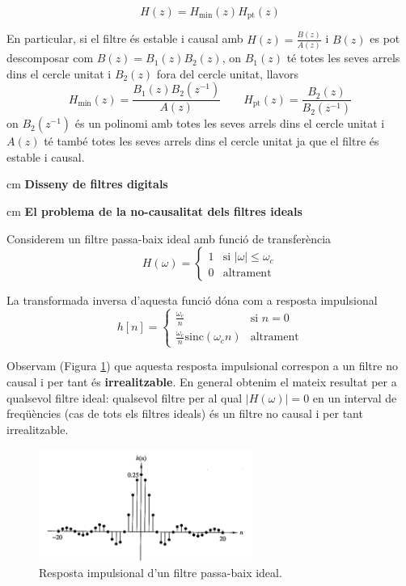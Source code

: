 \documentclass{article}
\begin{document}
\[
H(z)=H_{\text{min}}(z) H_{\text{pt}}(z)
\]

En particular, si el filtre és estable i causal amb $H(z)=\frac{B(z)}{A(z)}$ i 
$B(z)$ es pot descomposar com $B(z)=B_1(z) B_2(z)$,
on $B_1(z)$ té totes les seves arrels dins el cercle unitat i $B_2(z)$ fora del cercle unitat,
llavors 
\[
H_{\text{min}}(z)=\frac{ B_1(z) B_2(z^{-1}) }{A(z)}
\qquad 
H_{\text{pt}}(z)=\frac{B_2(z)}{B_2(z^{-1})}
\]
\noindent
on $B_2(z^{-1})$ és un polinomi amb totes les seves arrels dins el cercle unitat i $A(z)$ té també 
totes les seves arrels dins el cercle unitat ja que el filtre és estable i causal. 

 

 cm
\noindent
\textbf{\large Disseny de filtres digitals}

%
%
%
%

 cm
\noindent
\textbf{El problema de la no-causalitat dels filtres ideals}

Considerem un filtre passa-baix ideal amb funció de transferència
\[
H(\omega)=\begin{cases} 1 & \text{si } |\omega| \leq \omega_c \\ 0 & \text{altrament} \end{cases}
\]

La transformada inversa d'aquesta funció dóna com a resposta impulsional
\[
h[n]=\begin{cases} \frac{\omega_c}{n} & \text{si } n=0 \\ 
\frac{\omega_c}{n} \mathrm{sinc}(\omega_c n) & \text{altrament} \end{cases}
\]

Observam (Figura \ref{passabaixideal}) que aquesta resposta impulsional correspon a un filtre no causal i per tant és \textbf{irrealitzable}.
En general obtenim el mateix resultat per a qualsevol filtre ideal: qualsevol filtre per al qual
$|H(\omega)|=0$ en un interval de freqüències (cas de tots els filtres ideals) és un filtre no causal i per
tant irrealitzable.

\begin{figure}[htbp]
\begin{center}
\includegraphics[width=7cm]{passabaixideal.png}
\end{center}
\caption{Resposta impulsional d'un filtre passa-baix ideal.}
\label{passabaixideal}
\end{figure}
\end{document}
